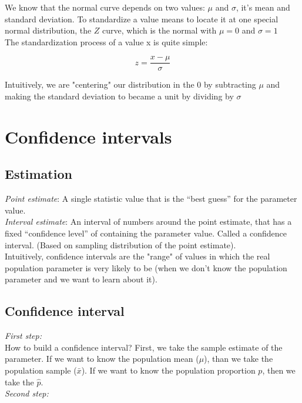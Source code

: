 \documentclass[11pt]{article}
\begin{document}
	We know that the normal curve depends on two values: $\mu$ and $\sigma$, it's mean and standard deviation. To standardize a value means to locate it at one special normal distribution, the $Z$ curve, which is the normal with $\mu =0 $ and $\sigma =1$\\

	The standardization process of a value x is quite simple:

	\[z=\frac{x - \mu}{\sigma}\]

	Intuitively, we are "centering" our distribution in the 0 by subtracting $\mu$ and making the standard deviation to became a unit by dividing by $\sigma$ 


\section{Confidence intervals}

	\subsection*{Estimation}
\emph{Point estimate}: A single statistic value that is the “best guess” for
the parameter value.\\

\emph{Interval estimate}: An interval of numbers around the point estimate, that has a fixed “confidence level” of containing the parameter value. Called a confidence interval. (Based on sampling distribution of the point estimate).\\

	Intuitively, confidence intervals are the "range" of values in which the real population parameter is very likely to be (when we don't know the population parameter and we want to learn about it).

	\subsection*{Confidence interval}
	
	\emph{First step:}\\
	
	How to build a confidence interval? First, we take the sample estimate of the parameter. If we want to know the population mean ($\mu$), than we take the population sample ($\bar{x}$). If we want to know the population proportion $p$, then we take the $\hat{p}$.\\

	\emph{Second step:}\\
\end{document}
